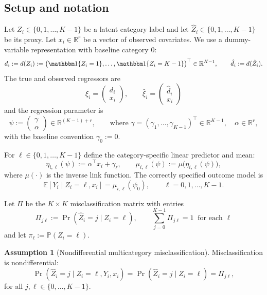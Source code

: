 \documentclass[11pt]{article}
\theoremstyle{definition}
\newtheorem{assumption}{Assumption}
\theoremstyle{remark}
\newcommand{\E}{\mathbb{E}}
\newcommand{\Pp}{\mathbb{P}}
\begin{document}
\subsection{Setup and notation}

Let $Z_i\in\{0,1,\dots,K-1\}$ be a latent category label and let $\hat Z_i\in\{0,1,\dots,K-1\}$ be its
 proxy. Let $x_i\in\mathbb R^r$ be a vector of observed covariates. We use a dummy-variable representation with baseline
category $0$:
\[
d_i := d(Z_i):=\big(\mathbbm 1\{Z_i=1\},\dots,\mathbbm 1\{Z_i=K-1\}\big)^\top\in\mathbb R^{K-1},
\qquad
\hat d_i := d(\hat Z_i).
\]
The true and observed regressors are
\[ \xi_i = \begin{pmatrix} d_i \\ x_i \end{pmatrix}, \qquad \hat\xi_i = \begin{pmatrix}
    \hat d_i \\ x_i
\end{pmatrix} \]
and the regression parameter is
\[
\psi:=\begin{pmatrix}\gamma\\ \alpha\end{pmatrix}\in\mathbb R^{(K-1)+r},
\qquad
\text{where } \gamma=(\gamma_1,\dots,\gamma_{K-1})^\top\in\mathbb R^{K-1},\quad \alpha\in\mathbb R^r,
\]
with the baseline convention $\gamma_0:=0$.

For $\ell\in\{0,1,\dots,K-1\}$ define the category-specific linear predictor and mean:
\begin{equation}
\eta_{i,\ell}(\psi):=\alpha^\top x_i+\gamma_\ell,
\qquad
\mu_{i,\ell}(\psi):=\mu\big(\eta_{i,\ell}(\psi)\big),
\label{eq:eta-multi}
\end{equation}
where $\mu(\cdot)$ is the inverse link function.
The correctly specified outcome model is
\begin{equation}
\E[Y_i\mid Z_i=\ell,x_i]=\mu_{i,\ell}(\psi_0),\qquad \ell=0,1,\dots,K-1.
\label{eq:glm-multi}
\end{equation}

Let $\Pi$ be the $K\times K$ misclassification matrix with entries
\begin{equation}
\Pi_{j\ell}:=\Pr(\hat Z_i=j\mid Z_i=\ell),\qquad \sum_{j=0}^{K-1}\Pi_{j\ell}=1\;\;\text{for each }\ell
\label{eq:Pi}
\end{equation}
and let $\pi_\ell:=\Pp(Z_i=\ell)$.

\begin{assumption}[Nondifferential multicategory misclassification]\label{ass:multi-nondiff}
Misclassification is nondifferential:
\[
\Pr(\hat Z_i=j\mid Z_i=\ell,Y_i,x_i)=\Pr(\hat Z_i=j\mid Z_i=\ell)=\Pi_{j\ell},
\]
for all $j,\ell\in\{0,\dots,K-1\}$.
\end{assumption}
\end{document}
